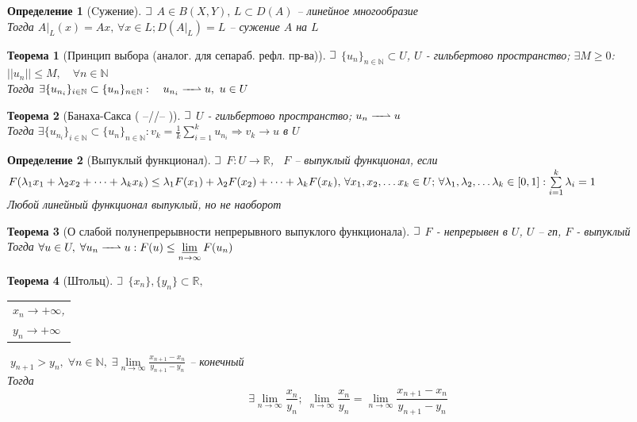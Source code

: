 \documentclass{article}
\theoremstyle{truestyle}
\newtheorem*{defenition}{Определение}
\newtheorem*{theorem}{Теорема}
\newcommand{\weakconv}{\xrightharpoonup{\quad\,}}
\def\letus{%
	\mathord{\setbox0=\hbox{$\exists$}%
		\hbox{\kern 0.125\wd0%
			\vbox to \ht0{%
				\hrule width 0.75\wd0%
				\vfill%
				\hrule width 0.75\wd0}%
			\vrule height \ht0%
			\kern 0.125\wd0}%
	}%
}
\begin{document}
\begin{defenition}[Cужение]
  $\letus$ $A \in B(X, Y), \, L \subset D(A)$ -- линейное многообразие\\
  Тогда $\left. A \right|_L (x) = Ax, \, \forall x \in L; D(\left. A \right|_L) = L$ -- сужение $A$ на $L$
\end{defenition}
    
\begin{theorem}[Принцип выбора (аналог. для сепараб. рефл. пр-ва)]
  $\letus$ $\{u_n\}_{n \in \mathbb{N}} \subset U$, $U$ - гильбертово пространство;
  $\exists M \ge 0$: $||u_n|| \le M, \quad \forall n \in \mathbb{N}$\\ 
  Тогда $\exists \{u_{n_i}\}_{i \in \mathbb{N}} \subset \{u_n\}_{n \in \mathbb{N}}: \quad u_{n_i} \weakconv u,\ u \in U$
\end{theorem}

\begin{theorem}[Банаха-Сакса ( --//-- )]
  $\letus$ $U$ - гильбертово пространство; $u_n  \weakconv u$\\
  Тогда $\exists \{u_{n_i}\}_{i \in \mathbb{N}} \subset \{u_n\}_{n \in \mathbb{N}}: 
  v_k = \frac{1}{k}\sum\limits_{i=1}^{k}u_{n_i} \Rightarrow v_k \longrightarrow u$ в $U$
\end{theorem}

\begin{defenition}[Выпуклый функционал]
  $\letus$ $F: U \longrightarrow \mathbb{R}$, \
  $F$ -- выпуклый функционал, если \\
  $F(\lambda_1 x_1 + \lambda_2 x_2 + \dots + \lambda_k x_k) \le \lambda_1 F(x_1) + \lambda_2 F(x_2) + \dots + \lambda_k F(x_k),\\
  \, \forall x_1, x_2, \dots x_k \in U; \, \forall \lambda_1, \lambda_2, \dots \lambda_k \in [0, 1]: \sum\limits_{i = 1}^{k}\lambda_i = 1$ \\
  Любой линейный функционал выпуклый, но не наоборот
\end{defenition}

\begin{theorem}[О слабой полунепрерывности непрерывного выпуклого функционала]
  $\letus$ $F$ - непрерывен в $U$, $U$ -- гп, $F$ - выпуклый\\
  Тогда $\forall u \in U, \; \forall u_n \weakconv u : F(u) \le \varliminf\limits_{n \to \infty}F(u_n)$
\end{theorem}

\begin{theorem}[Штольц]
  $\letus$ $\{x_n\}, \{y_n\} \subset \mathbb{R}, \;$
  \begin{tabular}[t]{l}
  $x_n \longrightarrow +\infty$, \\ $y_n \longrightarrow +\infty$
  \end{tabular}
  $\;y_{n+1} > y_n,\;\forall n \in \mathbb{N}, \; \exists \lim\limits_{n \to \infty} \frac{x_{n+1} - x_n}{y_{n+1} - y_n}$ -- конечный\\
  Тогда $$\exists \lim\limits_{n \to \infty} \frac{x_n}{y_n}; \; 
  \lim\limits_{n \to \infty} \frac{x_n}{y_n} = \lim\limits_{n \to \infty}\frac{x_{n+1} - x_n}{y_{n+1} - y_n}$$
\end{theorem}
\end{document}
